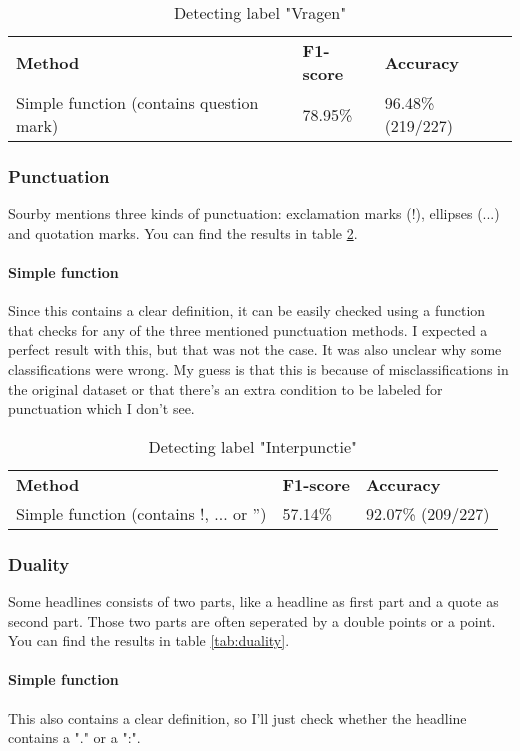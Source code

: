 \documentclass{article}
\begin{document}
\begin{table}[]
\begin{tabular}{lll}
\textbf{Method}                          & \textbf{F1-score} & \textbf{Accuracy} \\
Simple function (contains question mark) & 78.95\%           & 96.48\% (219/227)
\end{tabular}
\caption{Detecting label "Vragen"}
\label{tab:questions}
\end{table}

\subsubsection{Punctuation}
Sourby mentions three kinds of punctuation: exclamation marks (!), ellipses (...) and quotation marks. You can find the results in table \ref{tab:punctuation}.

\paragraph{Simple function} Since this contains a clear definition, it can be easily checked using a function that checks for any of the three mentioned punctuation methods. I expected a perfect result with this, but that was not the case. It was also unclear why some classifications were wrong. My guess is that this is because of misclassifications in the original dataset or that there's an extra condition to be labeled for punctuation which I don't see.

\begin{table}
\begin{tabular}{lll}
\textbf{Method}                          & \textbf{F1-score} & \textbf{Accuracy} \\
Simple function (contains !, ... or '') & 57.14\%           & 92.07\% (209/227)
\end{tabular}
\caption{Detecting label "Interpunctie"}
\label{tab:punctuation}
\end{table}

\subsubsection{Duality}
Some headlines consists of two parts, like a headline as first part and a quote as second part. Those two parts are often seperated by a double points or a point. \cite{soubry} You can find the results in table \ref{tab:duality}.

\paragraph{Simple function} This also contains a clear definition, so I'll just check whether the headline contains a "." or a ":".
\end{document}
